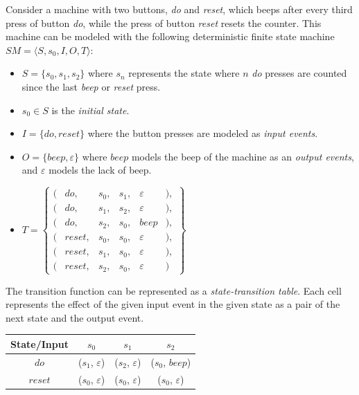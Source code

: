 \begin{example}\label{ex:fsm}
    Consider a machine with two buttons, \emph{do} and \emph{reset}, which beeps after every third press of button \emph{do}, while the press of button \emph{reset} resets the counter. This machine can be modeled with the following deterministic finite state machine $SM = \langle S, s_0, I, O, T \rangle$:
    \begin{itemize}
        \item $S = \{ s_0, s_1, s_2  \}$ where $s_n$ represents the state where $n$ \emph{do} presses are counted since the last \emph{beep} or \emph{reset} press.
        \item $s_0 \in S$ is the \textit{initial state}.
        \item $I = \{ do, reset \}$ where the button presses are modeled as \textit{input events}.
        \item $O = \{ beep, \varepsilon \}$ where $beep$ models the beep of the machine as an \textit{output events}, and $\varepsilon$ models the lack of beep.
        \item $T =
        \begin{Bmatrix}
        (&do,& s_0,& s_1,& \varepsilon&),\\
        (&do,& s_1,& s_2,& \varepsilon&),\\
        (&do,& s_2,& s_0,& beep&),\\
        (&reset,& s_0,& s_0,& \varepsilon&),\\
        (&reset,& s_1,& s_0,& \varepsilon&),\\
        (&reset,& s_2,& s_0,& \varepsilon&)
        \end{Bmatrix}$
    \end{itemize}

    The transition function can be represented as a \emph{state-transition table}. Each cell represents the effect of the given input event in the given state as a pair of the next state and the output event.

    \begin{table}[htbp]
    \centering
    \begin{tabular}{|c||c|c|c|}
     \hline
     State/Input & $s_0$ & $s_1$ & $s_2$ \\
     \hline\hline
     $do$ & ($s_1$, $\varepsilon$) & ($s_2$, $\varepsilon$) & ($s_0$, $beep$) \\ 
     \hline
     $reset$ & ($s_0$, $\varepsilon$) & ($s_0$, $\varepsilon$) & ($s_0$, $\varepsilon$) \\
     \hline
    \end{tabular}
    \label{tbl:stt}
    \end{table}


\end{example}

